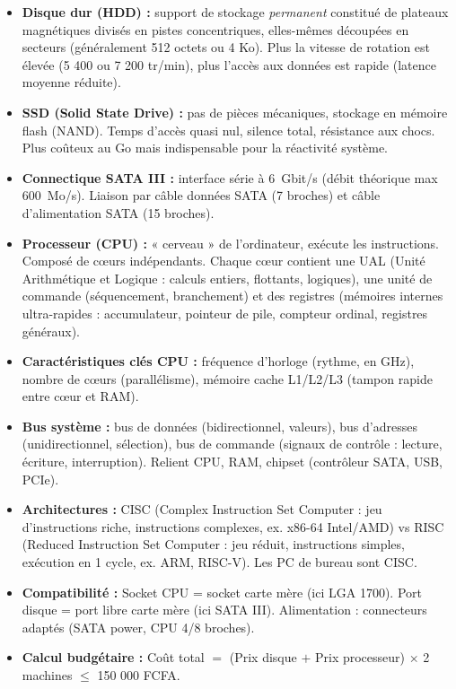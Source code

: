 \documentclass[11pt]{article}
\newcommand{\cle}[1]{{\popxbold\color{popdark}#1}}
\begin{document}
\begin{aretenir}
\begin{itemize}
\item \textbf{Disque dur (HDD) :} support de stockage \emph{permanent} constitué de plateaux magnétiques divisés en \cle{pistes} concentriques, elles-mêmes découpées en \cle{secteurs} (généralement 512 octets ou 4 Ko). Plus la \cle{vitesse de rotation} est élevée (5 400 ou 7 200 tr/min), plus l'accès aux données est rapide (latence moyenne réduite).
\item \textbf{SSD (Solid State Drive) :} pas de pièces mécaniques, stockage en mémoire flash (NAND). Temps d'accès quasi nul, silence total, résistance aux chocs. Plus coûteux au Go mais indispensable pour la réactivité système.
\item \textbf{Connectique SATA III :} interface série à \SI{6}{Gbit/s} (débit théorique max \approx \SI{600}{Mo/s}). Liaison par câble données SATA (7 broches) et câble d'alimentation SATA (15 broches).
\item \textbf{Processeur (CPU) :} « cerveau » de l'ordinateur, exécute les instructions. Composé de \cle{cœurs} indépendants. Chaque cœur contient une \cle{UAL} (Unité Arithmétique et Logique : calculs entiers, flottants, logiques), une \cle{unité de commande} (séquencement, branchement) et des \cle{registres} (mémoires internes ultra-rapides : accumulateur, pointeur de pile, compteur ordinal, registres généraux).
\item \textbf{Caractéristiques clés CPU :} \cle{fréquence d'horloge} (rythme, en GHz), \cle{nombre de cœurs} (parallélisme), \cle{mémoire cache} L1/L2/L3 (tampon rapide entre cœur et RAM).
\item \textbf{Bus système :} \cle{bus de données} (bidirectionnel, valeurs), \cle{bus d'adresses} (unidirectionnel, sélection), \cle{bus de commande} (signaux de contrôle : lecture, écriture, interruption). Relient CPU, RAM, chipset (contrôleur SATA, USB, PCIe).
\item \textbf{Architectures :} \cle{CISC} (Complex Instruction Set Computer : jeu d'instructions riche, instructions complexes, ex. x86-64 Intel/AMD) vs \cle{RISC} (Reduced Instruction Set Computer : jeu réduit, instructions simples, exécution en 1 cycle, ex. ARM, RISC-V). Les PC de bureau sont CISC.
\item \textbf{Compatibilité :} \cle{Socket} CPU = socket carte mère (ici LGA 1700). Port disque = port libre carte mère (ici SATA III). Alimentation : connecteurs adaptés (SATA power, CPU 4/8 broches).
\item \textbf{Calcul budgétaire :} Coût total $=$ (Prix disque $+$ Prix processeur) $\times$ 2 machines $\le$ 150 000 FCFA.
\end{itemize}
\end{aretenir}
\end{document}
